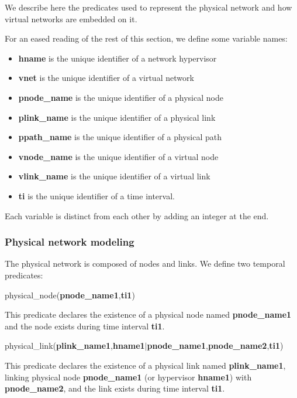 We describe here the predicates used to represent the physical network and how virtual networks are embedded on it.

For an eased reading of the rest of this section, we define some variable names:

\begin{itemize}
    \item \textbf{hname} is the unique identifier of a network hypervisor
    \item \textbf{vnet} is the unique identifier of a virtual network
    \item \textbf{pnode\_name} is the unique identifier of a physical node
    \item \textbf{plink\_name} is the unique identifier of a physical link
    \item \textbf{ppath\_name} is the unique identifier of a physical path
    \item \textbf{vnode\_name} is the unique identifier of a virtual node
    \item \textbf{vlink\_name} is the unique identifier of a virtual link
    \item \textbf{ti} is the unique identifier of a time interval.
\end{itemize}

Each variable is distinct from each other by adding an integer at the end.

\subsubsection{Physical network modeling}


The physical network is composed of nodes and links. We define two temporal predicates:

physical\_node(\textbf{pnode\_name1},\textbf{ti1})

This predicate declares the existence of a physical node named \textbf{pnode\_name1} and the node exists during time interval \textbf{ti1}.

physical\_link(\textbf{plink\_name1},\textbf{hname1}$\vert$\textbf{pnode\_name1},\textbf{pnode\_name2},\textbf{ti1})

This predicate declares the existence of a physical link named \textbf{plink\_name1}, linking physical node \textbf{pnode\_name1} (or hypervisor \textbf{hname1}) with \textbf{pnode\_name2}, and the link exists during time interval \textbf{ti1}.

